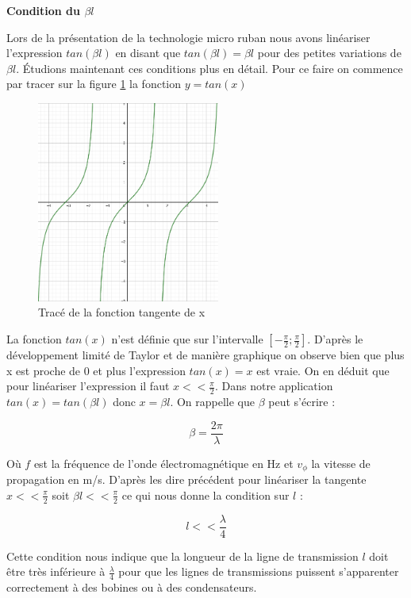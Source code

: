 \documentclass[french]{article}
\begin{document}
\textbf{Condition du $\beta l$\\}

Lors de la présentation de la technologie micro ruban nous avons linéariser l'expression $tan(\beta l)$ en disant que $tan(\beta l)=\beta l$ pour des petites variations de $\beta l$. Étudions maintenant ces conditions plus en détail. Pour ce faire on commence par tracer sur la figure \ref{fig:tan_x} la fonction $y = tan(x)$

\begin{figure}[H]
	\centering
	\includegraphics[width=6cm]{photo/tan_x.png}
	\caption{Tracé de la fonction tangente de x}
	\label{fig:tan_x}
\end{figure}

La fonction $tan(x)$ n'est définie que sur l'intervalle $[-\frac{\pi}{2}; \frac{\pi}{2}]$. D'après le développement limité de Taylor et de manière graphique on observe bien que plus x est proche de 0 et plus l'expression $tan(x) = x$ est vraie. On en déduit que pour linéariser l'expression il faut $x << \frac{\pi}{2}$. Dans notre application $tan(x) = tan(\beta l)$ donc $x = \beta l$. On rappelle que $\beta$ peut s'écrire :

\begin{equation}
	\beta = \frac{2 \pi}{\lambda}
\end{equation}

Où $f$ est la fréquence de l'onde électromagnétique en Hz et $v_\phi$ la vitesse de propagation en m/s. D'après les dire précédent pour linéariser la tangente $x << \frac{\pi}{2}$ soit $\beta l << \frac{\pi}{2}$ ce qui nous donne la condition sur $l$ :

\begin{equation}
	l << \frac{\lambda}{4}
\end{equation}

Cette condition nous indique que la longueur de la ligne de transmission $l$ doit être très inférieure à $\frac{\lambda}{4}$ pour que les lignes de transmissions puissent s'apparenter correctement à des bobines ou à des condensateurs.
\end{document}

